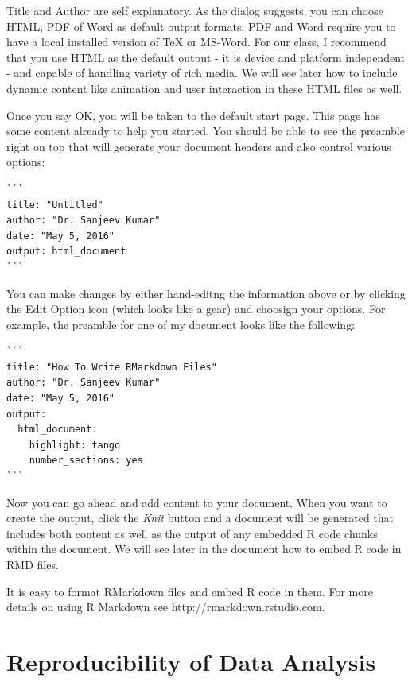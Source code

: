 \documentclass[11pt, letterpaper, twoside]{memoir}\usepackage{knitr}
\begin{document}

Title and Author are self explanatory. As the dialog suggests, you can choose HTML, PDF of Word as default output formats. PDF and Word require you to have a local installed version of TeX or MS-Word. For our class, I recommend that you use HTML as the default output - it is device and platform independent - and capable of handling variety of rich media. We will see later how to include dynamic content like animation and user interaction in these HTML files as well.

Once you say OK, you will be taken to the default start page. This page has some content already to help you started. You should be able to see the preamble right on top that will generate your document headers and also control various options:

\begin{verbatim}
```
title: "Untitled"
author: "Dr. Sanjeev Kumar"
date: "May 5, 2016"
output: html_document
```
\end{verbatim}

You can make changes by either hand-editng the information above or by clicking the Edit Option icon (which looks like a gear) and choosign your options. For example, the preamble for one of my document looks like the following:

\begin{verbatim}
```
title: "How To Write RMarkdown Files"
author: "Dr. Sanjeev Kumar"
date: "May 5, 2016"
output:
  html_document: 
    highlight: tango
    number_sections: yes
```
\end{verbatim}

Now you can go ahead and add content to your document. When you want to create the output,  click the \emph{Knit} button and a document will be generated that includes both content as well as the output of any embedded R code chunks within the document. We will see later in the document how to embed R code in RMD files.

It is easy to format RMarkdown files and embed R code in them. For more details on using R Markdown see http://rmarkdown.rstudio.com.

\section{Reproducibility of Data Analysis}
\end{document}
